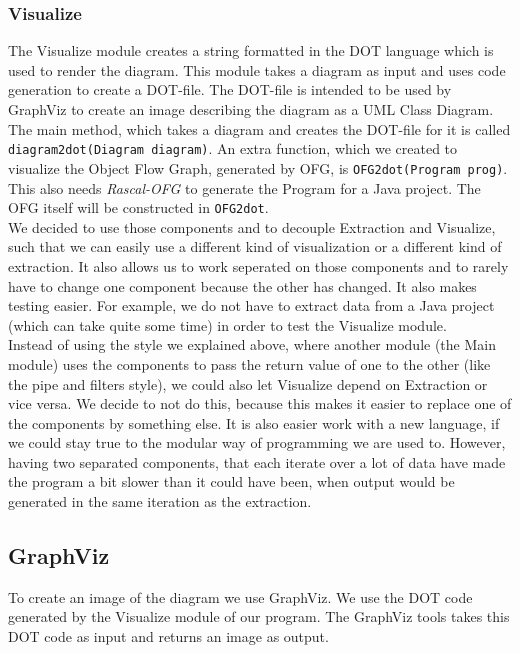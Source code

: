 \documentclass[a4paper,11pt]{article}
\begin{document}
		\subsubsection{Visualize}
			The Visualize module creates a string formatted in the DOT language which is used to render the diagram. This module takes a diagram as input and uses code generation to create a DOT-file. The DOT-file is intended to be used by GraphViz to create an image describing the diagram as a UML Class Diagram. The main method, which takes a diagram and creates the DOT-file for it is called \texttt{diagram2dot(Diagram diagram)}. An extra function, which we created to visualize the Object Flow Graph, generated by OFG, is \texttt{OFG2dot(Program prog)}. This also needs \emph{Rascal-OFG} to generate the Program for a Java project. The OFG itself will be constructed in \texttt{OFG2dot}. \\
	
			We decided to use those components and to decouple Extraction and Visualize, such that we can easily use a different kind of visualization or a different kind of extraction. It also allows us to work seperated on those components and to rarely have to change one component because the other has changed. It also makes testing easier. For example, we do not have to extract data from a Java project (which can take quite some time) in order to test the Visualize module. \\
	
			Instead of using the style we explained above, where another module (the Main module) uses the components to pass the return value of one to the other (like the pipe and filters style), we could also let Visualize depend on Extraction or vice versa. We decide to not do this, because this makes it easier to replace one of the components by something else. It is also easier work with a new language, if we could stay true to the modular way of programming we are used to. However, having two separated components, that each iterate over a lot of data have made the program a bit slower than it could have been, when output would be generated in the same iteration as the extraction.
	
		\subsection{GraphViz}
			To create an image of the diagram we use GraphViz. We use the DOT code generated by the Visualize module of our program. The GraphViz tools takes this DOT code as input and returns an image as output.
	
\end{document}

